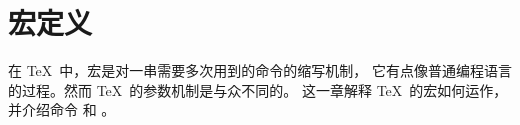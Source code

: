 \documentclass{book}
\begin{document}
\chapter{宏定义}\label{macro}

在 \TeX\ 中，宏是对一串需要多次用到的命令的缩写机制，
它有点像普通编程语言的过程。然而 \TeX\ 的参数机制是与众不同的。
这一章解释 \TeX\ 的宏如何运作，并介绍命令 和 。
\end{document}
